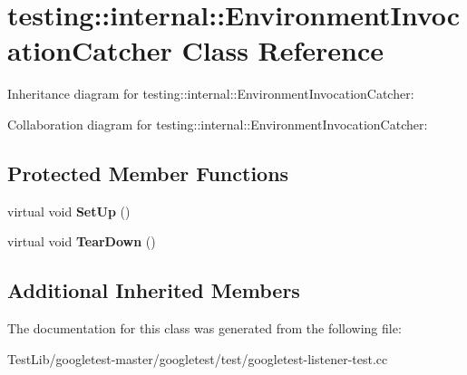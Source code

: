 \hypertarget{classtesting_1_1internal_1_1EnvironmentInvocationCatcher}{}\section{testing\+:\+:internal\+:\+:Environment\+Invocation\+Catcher Class Reference}
\label{classtesting_1_1internal_1_1EnvironmentInvocationCatcher}


Inheritance diagram for testing\+:\+:internal\+:\+:Environment\+Invocation\+Catcher\+:


Collaboration diagram for testing\+:\+:internal\+:\+:Environment\+Invocation\+Catcher\+:
\subsection*{Protected Member Functions}
\begin{DoxyCompactItemize}
\item 
\mbox{\label{classtesting_1_1internal_1_1EnvironmentInvocationCatcher_a325365b0ecfa71a4a767d7a1817c9663}} 
virtual void {\bfseries Set\+Up} ()
\item 
\mbox{\label{classtesting_1_1internal_1_1EnvironmentInvocationCatcher_afc89ee0a8e32e6746a89fcc1682f62e9}} 
virtual void {\bfseries Tear\+Down} ()
\end{DoxyCompactItemize}
\subsection*{Additional Inherited Members}


The documentation for this class was generated from the following file\+:\begin{DoxyCompactItemize}
\item 
Test\+Lib/googletest-\/master/googletest/test/googletest-\/listener-\/test.\+cc\end{DoxyCompactItemize}
